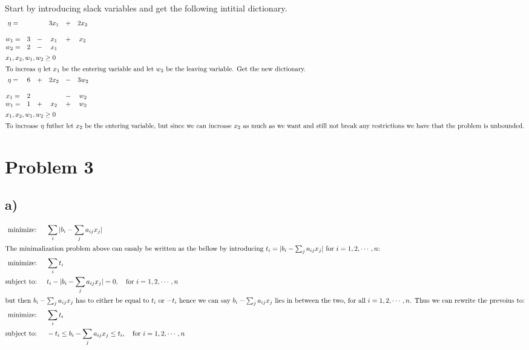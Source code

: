 \documentclass{article}
\begin{document}
Start by introducing slack variables and get the following intitial dictionary.
\begin{align*}
  &\begin{matrix}
     \eta = & & & 3x_1& + &2x_2 \\
     \\
     w_1 = & 3 & - & x_1& + &x_2  \\
     w_2 = & 2 & -&x_1 & & \\
   \end{matrix} \\
  &x_1, x_2, w_1, w_2 \geq 0 \\
  \intertext{To increas $\eta$ let $x_1$ be the entering variable and let $w_2$ be the leaving variable. Get the new dictionary.}
  &\begin{matrix}
     \eta = &6 & + & 2x_2& - &3w_2 \\
     \\
     x_1 = & 2 & & & -&w_2 \\
     w_1 = & 1 & + & x_2& + &w_2  \\
   \end{matrix} \\
  &x_1, x_2, w_1, w_2 \geq 0 \\
  \intertext{To increase $\eta$ futher let $x_2$ be the entering variable, but since we can increase $x_2$ as much as we want and still not break any restrictions we have that the problem is unbounded.}
\end{align*}


\section*{Problem 3}
\subsection*{a)}

\begin{align*}
  \text{minimize: \quad} &\sum_i|b_i - \sum_ja_{ij}x_j|\\
  \intertext{The minimalization problem above can easaly be written as the bellow by introducing $t_i = |b_i - \sum_ja_{ij}x_j|$ for $i = 1, 2, \cdots, n$:}
  \text{minimize: \quad} &\sum_i t_i \\
  \text{subject to: \quad} &t_i - |b_i - \sum_ja_{ij}x_j|  = 0, \text{\quad for $i = 1, 2, \cdots, n$}\\
  \intertext{but then $b_i - \sum_ja_{ij}x_j$ has to either be equal to $t_i$ or $-t_i$ hence we can say $b_i - \sum_ja_{ij}x_j$ lies in between the two, for all $i = 1, 2, \cdots, n$. Thus we can rewrite the prevoius to:}
  \text{minimize: \quad} &\sum_i t_i \\
  \text{subject to: \quad} &-t_i \leq b_i - \sum_ja_{ij}x_j \leq t_i, \text{\quad for $i = 1, 2, \cdots, n$}\\
\end{align*}
\end{document}
